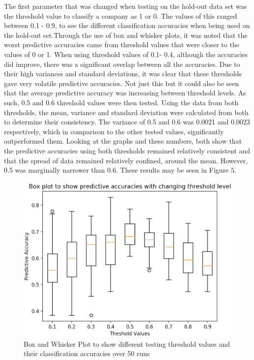 \documentclass[11pt]{article}
\begin{document}
The first parameter that was changed when testing on the hold-out data set was the threshold value to classify a company as 1 or 0. The values of this ranged between 0.1 - 0.9, to see the different classification accuracies when being used on the hold-out set.Through the use of box and whisker plots, it was noted that the worst predictive accuracies came from threshold values that were closer to the values of 0 or 1. When using threshold values of 0.1- 0.4, although the accuracies did improve, there was a significant overlap between all the accuracies. Due to their high variances and standard deviations, it was clear that these thresholds gave very volatile predictive accuracies. Not just this but it could also be seen that the average predictive accuracy was increasing between threshold levels. As such, 0.5 and 0.6 threshold values were then tested. Using the data from both thresholds, the mean, variance and standard deviation were calculated from both to determine their consistency. The variance of 0.5 and 0.6 was 0.0021 and 0.0023 respectively, which in comparison to the other tested values, significantly outperformed them. Looking at the graphs and these numbers, both show that the predictive accuracies using both thresholds remained relatively consistent and that the spread of data remained relatively confined, around the mean. However, 0.5 was marginally narrower than 0.6. These results may be seen in Figure 5. 
\begin{figure}[h]
\centering
\includegraphics[scale = .40]{thresh}
\caption{Box and Whisker Plot to show different testing threshold values and their classification accuracies over 50 runs} 
\end{figure}
\end{document}
